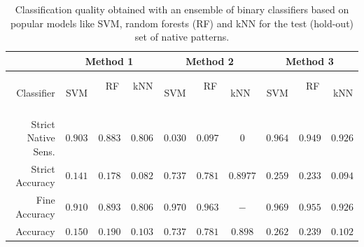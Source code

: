 \begin{table}[!htbp]
	\vspace{-12pt}
	\centering
	\caption{Classification quality obtained with an ensemble of binary classifiers based on popular models like SVM, random forests (RF) and kNN for the test (hold-out) set of native patterns.}
	\vspace{-3pt}
	\setlength{\tabcolsep}{5pt}
	\renewcommand{\arraystretch}{1}
	\footnotesize
	{	
		\begin{tabular}{|r||c|c|c||c|c|c||c|c|c|}
			\hline
			& \multicolumn{3}{c||}{Method 1} & \multicolumn{3}{c||}{Method 2} & \multicolumn{3}{c|}{Method 3}\\
			\hline
			Classifier & $\;\;$SVM$\;\;$ & $\;\;$RF$\;\;$ & $\,$kNN$\;\;$ & $\,$SVM$\;\;$ & $\;\;$RF$\;\;$ & $\,$kNN$\;\;$ & $\,$SVM$\;\;$ & $\;\;$RF$\;\;$ & $\,$kNN  \\
			\hline
			Strict Native Sens. & $0.903$ & $0.883$ & $0.806$ & $0.030$ & $0.097$ & $0$ & $0.964$ & $0.949$ & $0.926$ \\			
			Strict Accuracy  & $0.141$ & $0.178$ & $0.082$ & $0.737$ & $0.781$ & $0.8977$ & $0.259$ & $0.233$ & $0.094$ \\
			Fine Accuracy       & $0.910$ & $0.893$ & $0.806$ & $0.970$ & $0.963$ & $-$ & $0.969$ & $0.955$ & $0.926$ \\
			Accuracy  & $0.150$ & $0.190$ & $0.103$ & $0.737$ & $0.781$ & $0.898$ & $0.262$ & $0.239$ & $0.102$ \\
			\hline
		\end{tabular}	
	}
	\vspace{-0pt}
	\label{tab:results_classification_standard}
\end{table}
